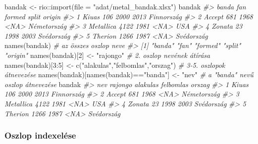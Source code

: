 \documentclass[
]{book}
\newenvironment{Shaded}{\begin{snugshade}}{\end{snugshade}}
\newcommand{\AttributeTok}[1]{\textcolor[rgb]{0.77,0.63,0.00}{#1}}
\newcommand{\CommentTok}[1]{\textcolor[rgb]{0.56,0.35,0.01}{\textit{#1}}}
\newcommand{\DecValTok}[1]{\textcolor[rgb]{0.00,0.00,0.81}{#1}}
\newcommand{\FunctionTok}[1]{\textcolor[rgb]{0.00,0.00,0.00}{#1}}
\newcommand{\NormalTok}[1]{#1}
\newcommand{\OtherTok}[1]{\textcolor[rgb]{0.56,0.35,0.01}{#1}}
\newcommand{\SpecialCharTok}[1]{\textcolor[rgb]{0.00,0.00,0.00}{#1}}
\newcommand{\StringTok}[1]{\textcolor[rgb]{0.31,0.60,0.02}{#1}}
\begin{document}
\begin{Shaded}
\begin{Highlighting}[]
\NormalTok{bandak }\OtherTok{\textless{}{-}}\NormalTok{ rio}\SpecialCharTok{::}\FunctionTok{import}\NormalTok{(}\AttributeTok{file =} \StringTok{"adat/metal\_bandak.xlsx"}\NormalTok{)}
\NormalTok{bandak}
\CommentTok{\#\textgreater{}       banda  fan formed split      origin}
\CommentTok{\#\textgreater{} 1     Kiuas  106   2000  2013  Finnország}
\CommentTok{\#\textgreater{} 2    Accept  681   1968  \textless{}NA\textgreater{} Németország}
\CommentTok{\#\textgreater{} 3 Metallica 4122   1981  \textless{}NA\textgreater{}         USA}
\CommentTok{\#\textgreater{} 4    Zonata   23   1998  2003  Svédország}
\CommentTok{\#\textgreater{} 5   Therion 1266   1987  \textless{}NA\textgreater{}  Svédország}
\FunctionTok{names}\NormalTok{(bandak)                     }\CommentTok{\# az összes oszlop neve }
\CommentTok{\#\textgreater{} [1] "banda"  "fan"    "formed" "split"  "origin"}
\FunctionTok{names}\NormalTok{(bandak)[}\DecValTok{2}\NormalTok{] }\OtherTok{\textless{}{-}} \StringTok{"rajongo"}     \CommentTok{\# 2. oszlop nevének átírása}
\FunctionTok{names}\NormalTok{(bandak)[}\DecValTok{3}\SpecialCharTok{:}\DecValTok{5}\NormalTok{] }\OtherTok{\textless{}{-}} \FunctionTok{c}\NormalTok{(}\StringTok{"alakulas"}\NormalTok{,}\StringTok{"felbomlas"}\NormalTok{,}\StringTok{"orszag"}\NormalTok{) }\CommentTok{\# 3{-}5. oszlopok átnevezése}
\FunctionTok{names}\NormalTok{(bandak)[}\FunctionTok{names}\NormalTok{(bandak)}\SpecialCharTok{==}\StringTok{"banda"}\NormalTok{] }\OtherTok{\textless{}{-}} \StringTok{"nev"} \CommentTok{\# a "banda" nevű oszlop átnevezése}
\NormalTok{bandak}
\CommentTok{\#\textgreater{}         nev rajongo alakulas felbomlas      orszag}
\CommentTok{\#\textgreater{} 1     Kiuas     106     2000      2013  Finnország}
\CommentTok{\#\textgreater{} 2    Accept     681     1968      \textless{}NA\textgreater{} Németország}
\CommentTok{\#\textgreater{} 3 Metallica    4122     1981      \textless{}NA\textgreater{}         USA}
\CommentTok{\#\textgreater{} 4    Zonata      23     1998      2003  Svédország}
\CommentTok{\#\textgreater{} 5   Therion    1266     1987      \textless{}NA\textgreater{}  Svédország}
\end{Highlighting}
\end{Shaded}

\hypertarget{oszlop-indexeluxe9se}{%
\subsubsection{Oszlop indexelése}\label{oszlop-indexeluxe9se}}
\end{document}

